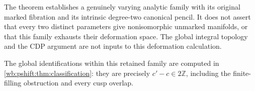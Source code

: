 The theorem establishes a genuinely varying analytic family with its
original marked fibration and its intrinsic degree-two canonical pencil.
It does not assert that every two distinct parameters give nonisomorphic
unmarked manifolds, or that this family exhausts their deformation space.
The global integral topology and the CDP argument are not inputs to this
deformation calculation.


The global identifications within this retained family are computed in
\cref{wb:pshift:thm:classification}: they are precisely $c'-c\in2\mathbb Z$,
including the finite-filling obstruction and every cusp overlap.
